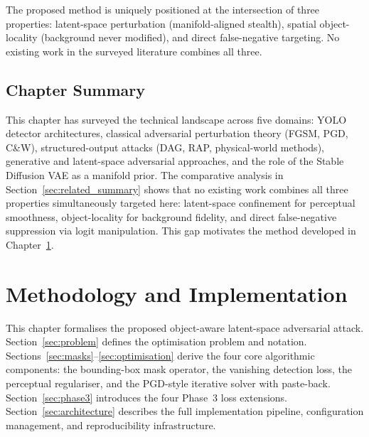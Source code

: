 \documentclass[12pt,a4paper]{report}
\begin{document}
The proposed method is uniquely positioned at the intersection of three
properties: latent-space perturbation (manifold-aligned stealth),
spatial object-locality (background never modified), and direct false-negative
targeting. No existing work in the surveyed literature combines all three.


\section*{Chapter Summary}

This chapter has surveyed the technical landscape across five domains: YOLO
detector architectures, classical adversarial perturbation theory (FGSM,
PGD, C\&W), structured-output attacks (DAG, RAP, physical-world methods),
generative and latent-space adversarial approaches, and the role of the
Stable Diffusion VAE as a manifold prior. The comparative analysis in
Section~\ref{sec:related_summary} shows that no existing work combines all three
properties simultaneously targeted here: latent-space confinement for
perceptual smoothness, object-locality for background fidelity, and direct
false-negative suppression via logit manipulation. This gap motivates the
method developed in Chapter~\ref{ch:method}.

\chapter{Methodology and Implementation}
\label{ch:method}

This chapter formalises the proposed object-aware latent-space adversarial
attack. Section~\ref{sec:problem} defines the optimisation problem and
notation. Sections~\ref{sec:masks}--\ref{sec:optimisation} derive the four
core algorithmic components: the bounding-box mask operator, the vanishing
detection loss, the perceptual regulariser, and the PGD-style iterative
solver with paste-back. Section~\ref{sec:phase3} introduces the four Phase~3
loss extensions. Section~\ref{sec:architecture} describes the full implementation
pipeline, configuration management, and reproducibility infrastructure.
\end{document}
